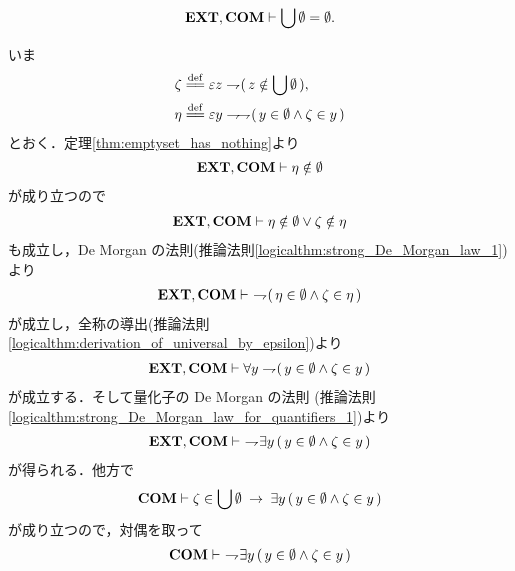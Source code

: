 	\begin{screen}
		\begin{thm}[空集合の合併は空]\label{thm:the_union_of_the_emptyset_is_empty}
			\begin{align}
				\mbox{{\bf EXT}},\mbox{\bf COM} \vdash \bigcup \emptyset = \emptyset.
			\end{align}
		\end{thm}
	\end{screen}
	
	\begin{sketch}
		いま
		\begin{align}
			\zeta &\defeq \varepsilon z \negation (\, z \notin \bigcup \emptyset\, ), \\
			\eta &\defeq \varepsilon y \negation \negation (\, y \in \emptyset \wedge \zeta \in y\, )
		\end{align}
		とおく．定理\ref{thm:emptyset_has_nothing}より
		\begin{align}
			\mbox{{\bf EXT}},\mbox{\bf COM} \vdash \eta \notin \emptyset
		\end{align}
		が成り立つので
		\begin{align}
			\mbox{{\bf EXT}},\mbox{\bf COM} \vdash \eta \notin \emptyset \vee \zeta \notin \eta
		\end{align}
		も成立し，De Morgan の法則(推論法則\ref{logicalthm:strong_De_Morgan_law_1})より
		\begin{align}
			\mbox{{\bf EXT}},\mbox{\bf COM} \vdash\ \rightharpoondown\hspace{-0.25em} (\, \eta \in \emptyset \wedge \zeta \in \eta\, )
		\end{align}
		が成立し，全称の導出(推論法則\ref{logicalthm:derivation_of_universal_by_epsilon})より
		\begin{align}
			\mbox{{\bf EXT}},\mbox{\bf COM} \vdash \forall y \rightharpoondown\hspace{-0.25em} (\, y \in \emptyset \wedge \zeta \in y\, )
		\end{align}
		が成立する．そして量化子の De Morgan の法則
		(推論法則\ref{logicalthm:strong_De_Morgan_law_for_quantifiers_1})より
		\begin{align}
			\mbox{{\bf EXT}},\mbox{\bf COM} \vdash\ \rightharpoondown\hspace{-0.25em} \exists y\, (\, y \in \emptyset \wedge \zeta \in y\, )
			\label{fom:the_union_of_the_emptyset_is_empty_1}
		\end{align}
		が得られる．他方で
		\begin{align}
			\mbox{\bf COM} \vdash \zeta \in \bigcup \emptyset
			\hspace{0.25em}\rightarrow\hspace{0.25em} \exists y\, (\, y \in \emptyset \wedge \zeta \in y\, )
		\end{align}
		が成り立つので，対偶を取って
		\begin{align}
			\COMAX \vdash\ 
			\negation \exists y\, (\, y \in \emptyset \wedge \zeta \in y\, )

\end{align}
\end{sketch}
